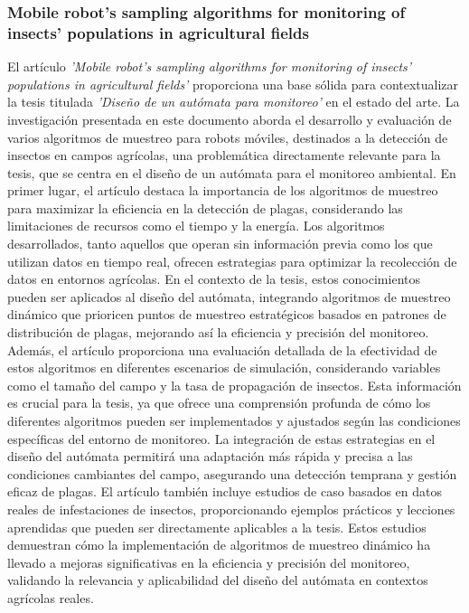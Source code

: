 \subsubsection{Mobile robot's sampling algorithms for monitoring of insects' populations in agricultural fields} %
\label{ssub:subsubsection name2}
    El art\'iculo \textit{'Mobile robot's sampling algorithms for monitoring of insects' populations in agricultural fields'} 
        proporciona una base s\'olida para contextualizar la tesis titulada \textit{'Dise\~no de un aut\'omata para monitoreo'} 
        en el estado del arte. La investigaci\'on presentada en este documento aborda el desarrollo y evaluaci\'on de varios 
        algoritmos de muestreo para robots m\'oviles, destinados a la detecci\'on de insectos en campos agr\'icolas, 
        una problem\'atica directamente relevante para la tesis, que se centra en el dise\~no de un aut\'omata para el monitoreo 
        ambiental. \cite{Yehoshua2023}
    \vskip 0.5cm
    En primer lugar, el art\'iculo destaca la importancia de los algoritmos de muestreo para maximizar la eficiencia en la 
        detecci\'on de plagas, considerando las limitaciones de recursos como el tiempo y la energ\'ia. Los algoritmos 
        desarrollados, tanto aquellos que operan sin informaci\'on previa como los que utilizan datos en tiempo real, 
        ofrecen estrategias para optimizar la recolecci\'on de datos en entornos agr\'icolas. En el contexto de la tesis, 
        estos conocimientos pueden ser aplicados al dise\~no del aut\'omata, integrando algoritmos de muestreo din\'amico 
        que prioricen puntos de muestreo estrat\'egicos basados en patrones de distribuci\'on de plagas, mejorando as\'i 
        la eficiencia y precisi\'on del monitoreo. \cite{Yehoshua2023}
    \vskip 0.5cm
    Adem\'as, el art\'iculo proporciona una evaluaci\'on detallada de la efectividad de estos algoritmos en diferentes 
        escenarios de simulaci\'on, considerando variables como el tama\~no del campo y la tasa de propagaci\'on de insectos. 
        Esta informaci\'on es crucial para la tesis, ya que ofrece una comprensi\'on profunda de c\'omo los diferentes 
        algoritmos pueden ser implementados y ajustados seg\'un las condiciones espec\'ificas del entorno de monitoreo. 
        La integraci\'on de estas estrategias en el dise\~no del aut\'omata permitir\'a una adaptaci\'on m\'as r\'apida y precisa 
        a las condiciones cambiantes del campo, asegurando una detecci\'on temprana y gesti\'on eficaz de plagas.
    \vskip 0.5cm
    El art\'iculo tambi\'en incluye estudios de caso basados en datos reales de infestaciones de insectos, 
        proporcionando ejemplos pr\'acticos y lecciones aprendidas que pueden ser directamente aplicables 
        a la tesis. Estos estudios demuestran c\'omo la implementaci\'on de algoritmos de muestreo din\'amico
        ha llevado a mejoras significativas en la eficiencia y precisi\'on del monitoreo, validando la 
        relevancia y aplicabilidad del dise\~no del aut\'omata en contextos agr\'icolas reales. \cite{Yehoshua2023}

